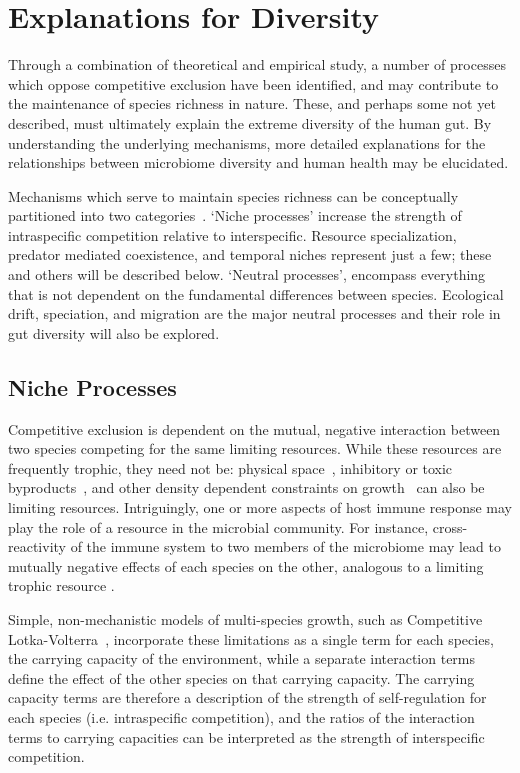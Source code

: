 \documentclass[12pt]{article}
\begin{document}
\section{Explanations for Diversity}
Through a combination of theoretical and empirical study, a number of
processes which oppose competitive exclusion have been identified,
and may contribute to the maintenance of species richness in nature.
These, and perhaps some not yet described,
must ultimately explain the extreme diversity of the human gut.
By understanding the underlying mechanisms,
more detailed explanations for the relationships between microbiome
diversity and human health may be elucidated.

Mechanisms which serve to maintain species richness can be conceptually
partitioned into two categories~\citep{Vellend2010}.
`Niche processes' increase the strength of intraspecific competition
relative to interspecific.
Resource specialization, predator mediated coexistence, and temporal niches
represent just a few;
these and others will be described below.
`Neutral processes', encompass everything that is not dependent on the
fundamental differences between species.
Ecological drift, speciation, and migration are the major neutral processes
and their role in gut diversity will also be explored.

\subsection{Niche Processes}
Competitive exclusion is dependent on the mutual, negative interaction
between two species competing for the same limiting resources.
While these resources are frequently trophic, they need not be:
physical space~\citep{Hastings1980,TODO},
inhibitory or toxic byproducts~\citep{TODO},
and other density dependent constraints on growth~\citep{TODO}
can also be limiting resources.
Intriguingly, one or more aspects of host immune response may
play the role of a resource in the microbial community.
For instance, cross-reactivity of the immune system to two members
of the microbiome may lead to mutually negative effects of each
species on the other, analogous to a limiting trophic resource
\citep[For a review of the interaction of the microbiota with the immune system:][]{Brestoff2013}.

Simple, non-mechanistic models of multi-species growth,
such as Competitive Lotka-Volterra~\citep{Lotka1925,Volterra1928},
incorporate these limitations as a single term for each species,
the carrying capacity of the environment,
while a separate interaction terms define the effect of the other species
on that carrying capacity.
The carrying capacity terms are therefore a description of the strength
of self-regulation for each species
(i.e\@. intraspecific competition),
and the ratios of the interaction terms to carrying capacities can
be interpreted as the strength of interspecific competition.
\end{document}
